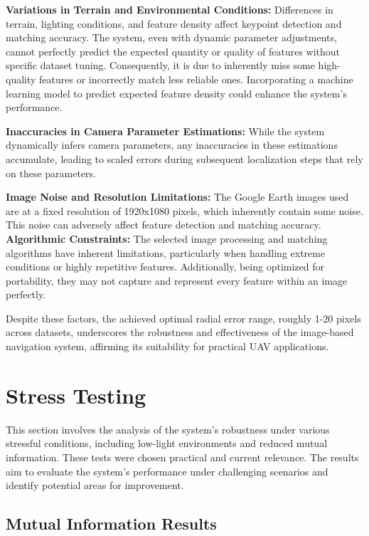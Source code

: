 \textbf{Variations in Terrain and Environmental Conditions:} Differences in terrain, lighting conditions, and feature density affect keypoint detection and matching accuracy. The system, even with dynamic parameter adjustments, cannot perfectly predict the expected quantity or quality of features without specific dataset tuning. Consequently, it is due to inherently miss some high-quality features or incorrectly match less reliable ones. Incorporating a machine learning model to predict expected feature density could enhance the system's performance.

\textbf{Inaccuracies in Camera Parameter Estimations:} While the system dynamically infers camera parameters, any inaccuracies in these estimations accumulate, leading to scaled errors during subsequent localization steps that rely on these parameters.

\textbf{Image Noise and Resolution Limitations:} The Google Earth images used are at a fixed resolution of 1920x1080 pixels, which inherently contain some noise. This noise can adversely affect feature detection and matching accuracy.
\textbf{Algorithmic Constraints:} The selected image processing and matching algorithms have inherent limitations, particularly when handling extreme conditions or highly repetitive features. Additionally, being optimized for portability, they may not capture and represent every feature within an image perfectly.

Despite these factors, the achieved optimal radial error range, roughly 1-20 pixels across datasets, underscores the robustness and effectiveness of the image-based navigation system, affirming its suitability for practical UAV applications.

\section{Stress Testing}

This section involves the analysis of the system's robustness under various stressful conditions, including low-light environments and reduced mutual information. These tests were chosen practical and current relevance. The results aim to evaluate the system's performance under challenging scenarios and identify potential areas for improvement.

\subsection{Mutual Information Results}

